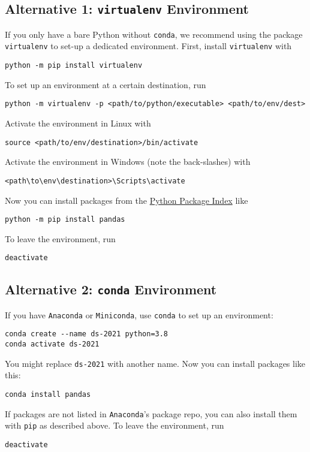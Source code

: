 \documentclass[12pt]{article}
\newcommand{\code}[1]{\textcolor{kitgreen}{\texttt{#1}}}
\begin{document}
\subsection{Alternative 1: \code{virtualenv} Environment}

If you only have a bare Python without \code{conda}, we recommend using the package \code{virtualenv} to set-up a dedicated environment.
First, install \code{virtualenv} with
%
\begin{lstlisting}[style=cmdblock]
python -m pip install virtualenv
\end{lstlisting}
%
To set up an environment at a certain destination, run
%
\begin{lstlisting}[style=cmdblock]
python -m virtualenv -p <path/to/python/executable> <path/to/env/dest>
\end{lstlisting}
%
Activate the environment in Linux with
%
\begin{lstlisting}[style=cmdblock]
source <path/to/env/destination>/bin/activate
\end{lstlisting}
%
Activate the environment in Windows (note the back-slashes) with
%
\begin{lstlisting}[style=cmdblock]
<path\to\env\destination>\Scripts\activate
\end{lstlisting}
%
Now you can install packages from the \href{https://pypi.org/}{Python Package Index} like
%
\begin{lstlisting}[style=cmdblock]
python -m pip install pandas
\end{lstlisting}
%
To leave the environment, run
%
\begin{lstlisting}[style=cmdblock]
deactivate
\end{lstlisting}

\subsection{Alternative 2: \code{conda} Environment}

If you have \code{Anaconda} or \code{Miniconda}, use \code{conda} to set up an environment:
%
\begin{lstlisting}[style=cmdblock]
conda create --name ds-2021 python=3.8
conda activate ds-2021
\end{lstlisting}
%
You might replace \code{ds-2021} with another name.
Now you can install packages like this:
%
\begin{lstlisting}[style=cmdblock]
conda install pandas
\end{lstlisting}
%
If packages are not listed in \code{Anaconda}'s package repo, you can also install them with \code{pip} as described above.
To leave the environment, run
%
\begin{lstlisting}[style=cmdblock]
deactivate
\end{lstlisting}
\end{document}
